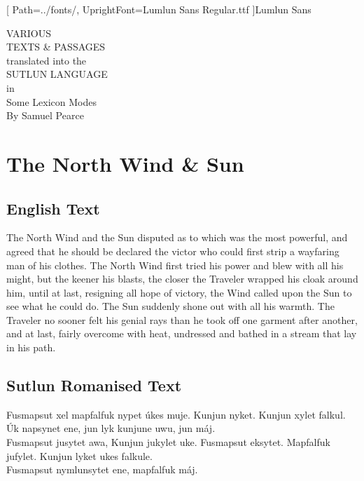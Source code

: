 \documentclass{article}
\begin{document}
\newfontfamily{\lmln}[
    Path=../fonts/,
    UprightFont=Lumlun Sans Regular.ttf
]{Lumlun Sans}

\newcommand{\ortho}[1]{{\lmln\Large{\raggedright#1}\par}}

\begingroup
\centering
\vfill
\Huge{VARIOUS}\\
\Huge{TEXTS \& PASSAGES}\\
\huge{translated into the}\\
\huge{SUTLUN LANGUAGE}\\
\large{in}\\
\Large{Some Lexicon Modes}\\
\vspace{3cm}
\Large{By Samuel Pearce}\\
\vfill\null
\endgroup
\thispagestyle{empty}

\tableofcontents

\section{The North Wind \& Sun}
\subsection{English Text}

    The North Wind and the Sun disputed as to which was the most powerful,
    and agreed that he should be declared the victor who could first strip a wayfaring man of his clothes.
    The North Wind first tried his power and blew with all his might, but the keener his blasts,
    the closer the Traveler wrapped his cloak around him, until at last, resigning all hope of victory,
    the Wind called upon the Sun to see what he could do. The Sun suddenly shone out with all his warmth.
    The Traveler no sooner felt his genial rays than he took off one garment after another, and at last,
    fairly overcome with heat, undressed and bathed in a stream that lay in his path.

\subsection{Sutlun Romanised Text}

    Fusmapsut xel mapfalfuk nypet úkes muje. Kunjun nyket. Kunjun xylet falkul.\\
    Úk napsynet ene, jun lyk kunjune uwu, jun máj.\\
    Fusmapsut jusytet awa, Kunjun jukylet uke. Fusmapsut eksytet.
    Mapfalfuk jufylet. Kunjun lyket ukes falkule.\\
    Fusmapsut nymlunsytet ene, mapfalfuk máj.\\
\end{document}
